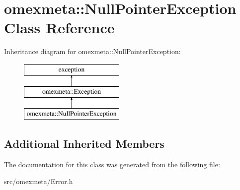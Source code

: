 \hypertarget{classomexmeta_1_1NullPointerException}{}\section{omexmeta\+:\+:Null\+Pointer\+Exception Class Reference}
\label{classomexmeta_1_1NullPointerException}
Inheritance diagram for omexmeta\+:\+:Null\+Pointer\+Exception\+:\begin{figure}[H]
\begin{center}
\leavevmode
\includegraphics[height=3.000000cm]{classomexmeta_1_1NullPointerException}
\end{center}
\end{figure}
\subsection*{Additional Inherited Members}


The documentation for this class was generated from the following file\+:\begin{DoxyCompactItemize}
\item 
src/omexmeta/Error.\+h\end{DoxyCompactItemize}

